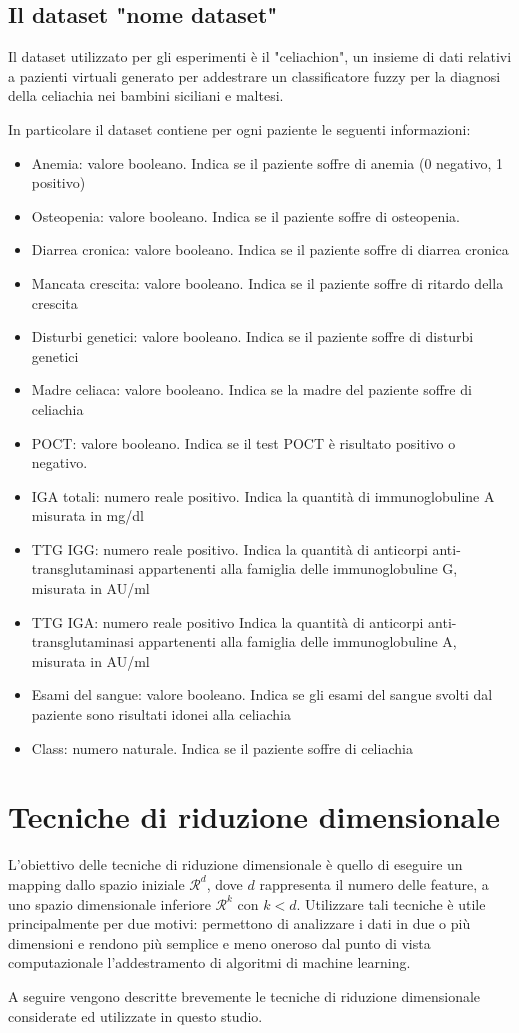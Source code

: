 \documentclass[11pt,a4paper,twocolumn]{article}
\begin{document}
\subsection{Il dataset "nome dataset"}
Il dataset utilizzato per gli esperimenti è il "celiachion", un insieme di dati relativi a pazienti virtuali generato per addestrare un classificatore fuzzy per la diagnosi della celiachia nei bambini siciliani e maltesi.\par
In particolare il dataset contiene per ogni paziente le seguenti informazioni:
\begin{itemize}
	\item Anemia: valore booleano. Indica se il paziente soffre di anemia (0 negativo, 1 positivo)
	\item Osteopenia: valore booleano. Indica se il paziente soffre di osteopenia.
	\item Diarrea cronica: valore booleano. Indica se il paziente soffre di diarrea cronica
	\item Mancata crescita: valore booleano. Indica se il paziente soffre di ritardo della crescita
	\item Disturbi genetici: valore booleano. Indica se il paziente soffre di disturbi genetici
	\item Madre celiaca: valore booleano. Indica se la madre del paziente soffre di celiachia
	\item POCT: valore booleano. Indica se il test POCT è risultato positivo o negativo.
	\item IGA totali: numero reale positivo. Indica la quantità di immunoglobuline A misurata in mg/dl
	\item TTG IGG: numero reale positivo. Indica la quantità di anticorpi anti-transglutaminasi appartenenti alla famiglia delle immunoglobuline G, misurata in AU/ml
	\item TTG IGA: numero reale positivo Indica la quantità di anticorpi anti-transglutaminasi appartenenti alla famiglia delle immunoglobuline A, misurata in AU/ml
	\item Esami del sangue: valore booleano. Indica se gli esami del sangue svolti dal paziente sono risultati idonei alla celiachia
	\item Class: numero naturale. Indica se il paziente soffre di celiachia
\end{itemize}
\section{Tecniche di riduzione dimensionale}
L'obiettivo delle tecniche di riduzione dimensionale è quello di eseguire un mapping dallo spazio iniziale $ \mathcal{R}^d$, dove $ d $ rappresenta il numero delle feature, a uno spazio dimensionale inferiore  $ \mathcal{R}^k$ con $ k<d $. Utilizzare tali tecniche è utile principalmente per due motivi: permettono di analizzare i dati in due o più dimensioni e rendono più semplice e meno oneroso dal punto di vista computazionale l'addestramento di algoritmi di machine learning. \par
A seguire vengono descritte brevemente le tecniche di riduzione dimensionale considerate ed utilizzate in questo studio. 
\end{document}
